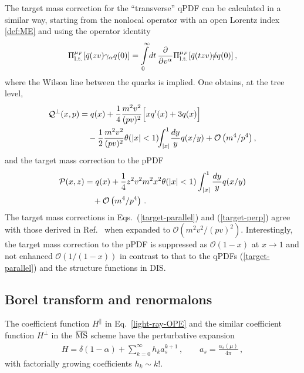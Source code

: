 The target mass correction for the ``transverse'' qPDF can be calculated in a similar way,
starting from the nonlocal operator with an open Lorentz index \eqref{def:ME} and 
using the operator identity~\cite{Balitsky:1987bk}
\begin{align}
\Pi_{\rm l.t.}^{\mu_F}[\bar q (z v) \gamma_\alpha q(0)]
=  \int\limits_0^\infty \!dt\,\frac{\partial}{\partial v^\alpha} 
\Pi_{\rm l.t.}^{\mu_F}[\bar q ( t z v) \slashed{v} q(0)]\,,
\end{align}   
where the Wilson line between the quarks is implied. One obtains, at the tree level,
\begin{align}
\label{target-perp}
 \mathcal{Q}^\perp(x,p)  &=  q(x) + \frac{1}{4} \frac{ m^2 v^2 }{(pv)^2} \Big[ x q'(x) + 3 q(x) \Big]
\notag\\&\quad
-  \frac{1}{2} \frac{m^2 v^2}{(pv)^2} \theta(|x|<1)\!\! \int_{|x|}^1\! \frac{dy}{y} q(x/y) 
+ \mathcal{O}\left({m^4}/{p^4}\right),
\end{align}
and the target mass correction to the pPDF
\begin{align}
\label{target-pPDF}
 \mathcal{P}(x,z) &=  q(x) +  \frac14 z^2 v^2 m^2 x^2 \theta(|x|<1) \int_{|x|}^1 \frac{dy}{y} q(x/y)
\notag\\&\quad
+ \mathcal{O}\left({m^4}/{p^4}\right)\,.
\end{align}
The target mass corrections in Eqs.~(\ref{target-parallel}) and (\ref{target-perp}) agree with those derived in Ref.~\cite{Chen:2016utp} when expanded to $\mathcal O(m^2v^2/(pv)^2)$. Interestingly, the target mass correction to the pPDF is suppressed as $\mathcal{O}(1-x)$ at $x\to 1$ and not enhanced $\mathcal{O}(1/(1-x))$ 
in contrast to that to the qPDFs (\ref{target-parallel}) and the structure functions in DIS.

\subsection{Borel transform and renormalons}

The coefficient function $H^\parallel$ in Eq.~\eqref{light-ray-OPE} and the similar coefficient function 
$H^\perp$ in the $\MSbar$ scheme have the perturbative expansion 
\begin{align}
 H = \delta(1-\alpha) + \sum_{k=0}^\infty h_k a_s^{k+1}\,,\qquad a_s = \frac{\alpha_s(\mu)}{4\pi}\,, 
\end{align}
with factorially growing coefficients $h_k\sim k!$.


